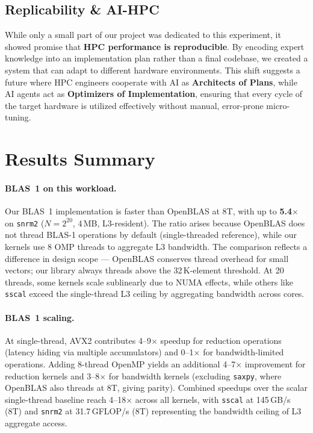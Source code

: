 \documentclass[11pt,a4paper]{article}
\begin{document}
\subsection{Replicability \& AI-HPC}
While only a small part of our project was dedicated to this experiment, it showed promise that \textbf{HPC performance is reproducible}. By encoding expert knowledge into an implementation plan rather than a final codebase, we created a system that can adapt to different hardware environments. This shift suggests a future where HPC engineers cooperate with AI as \textbf{Architects of Plans}, while AI agents act as \textbf{Optimizers of Implementation}, ensuring that every cycle of the target hardware is utilized effectively without manual, error-prone micro-tuning.

\newpage
\section{Results Summary}

\paragraph{BLAS~1 on this workload.}
Our BLAS~1 implementation is faster than OpenBLAS at 8T, with up to \textbf{5.4$\times$} on \texttt{snrm2} ($N = 2^{20}$, 4\,MB, L3-resident). The ratio arises because OpenBLAS does not thread BLAS-1 operations by default (single-threaded reference), while our kernels use 8 OMP threads to aggregate L3 bandwidth. The comparison reflects a difference in design scope — OpenBLAS conserves thread overhead for small vectors; our library always threads above the 32\,K-element threshold. At 20 threads, some kernels scale sublinearly due to NUMA effects, while others like \texttt{sscal} exceed the single-thread L3 ceiling by aggregating bandwidth across cores.

\paragraph{BLAS~1 scaling.}
At single-thread, AVX2 contributes 4--9$\times$ speedup for reduction operations (latency hiding via multiple accumulators) and 0--1$\times$ for bandwidth-limited operations. Adding 8-thread OpenMP yields an additional 4--7$\times$ improvement for reduction kernels and 3--8$\times$ for bandwidth kernels (excluding \texttt{saxpy}, where OpenBLAS also threads at 8T, giving parity). Combined speedups over the scalar single-thread baseline reach 4--18$\times$ across all kernels, with \texttt{sscal} at 145\,GB/s (8T) and \texttt{snrm2} at 31.7\,GFLOP/s (8T) representing the bandwidth ceiling of L3 aggregate access.
\end{document}
